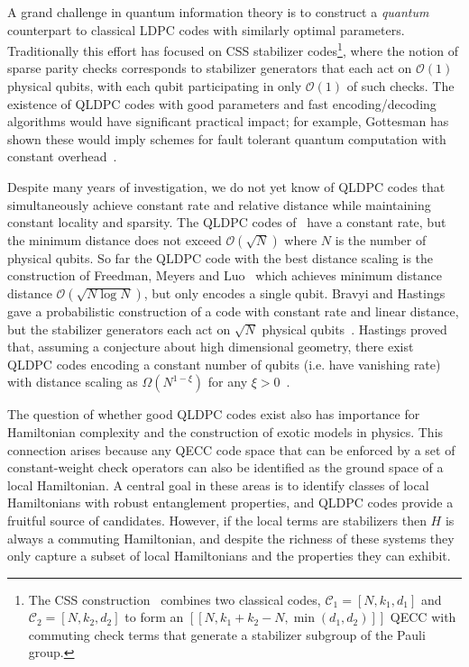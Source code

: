 \documentclass[11pt,letterpaper]{article}
\theoremstyle{definition}
\theoremstyle{remark}
\numberwithin{equation}{section}
\theoremstyle{definition}
\begin{document}
A grand challenge in quantum information theory is to construct a \emph{quantum} counterpart to classical LDPC codes with similarly optimal parameters. Traditionally this effort has focused on CSS stabilizer codes\footnote{The CSS construction~\cite{calderbank1996good,steane1996multiple} combines two classical codes, $\mathcal{C}_1 = [N,k_1,d_1]$ and $\mathcal{C}_2 = [N,k_2,d_2]$ to form an $[[N,k_1 + k_2 - N, \min(d_1,d_2)]]$ QECC with commuting check terms that generate a stabilizer subgroup of the Pauli group.}, where the notion of sparse parity checks corresponds to stabilizer generators that each act on $\mathcal{O}(1)$ physical qubits, with each qubit participating in only $\mathcal{O}(1)$ of such checks. The existence of QLDPC codes with good parameters and fast encoding/decoding algorithms would have significant practical impact; for example, Gottesman has shown these would imply schemes for fault tolerant quantum computation with constant overhead~\cite{gottesman2013fault}. 

Despite many years of investigation, we do not yet know of QLDPC codes that simultaneously achieve constant rate and relative distance while maintaining constant locality and sparsity. The QLDPC codes of~\cite{tillich2014quantum, lloyd2017polylog} have a constant rate, \iffalse, constant locality and sparsity,\fi but the minimum distance does not exceed $\mathcal{O}(\sqrt{N})$ where $N$ is the number of physical qubits. So far the QLDPC code with the best distance scaling is the construction of Freedman, Meyers and Luo~\cite{freedman2002z2} which achieves minimum distance distance $\mathcal{O}(\sqrt{N \log N})$, but only encodes a single qubit.  Bravyi and Hastings gave a probabilistic construction of a code with constant rate and linear distance, but the stabilizer generators each act on $\sqrt{N}$ physical qubits~\cite{bravyi2014homological}. Hastings proved that, assuming a conjecture about high dimensional geometry, there exist QLDPC codes encoding a constant number of qubits (i.e. have vanishing rate) with distance scaling as $\Omega(N^{1 - \xi})$ for any $\xi > 0$~\cite{hastings2017quantum,hastings2017weight}.

%

The question of whether good QLDPC codes exist also has importance for Hamiltonian complexity and the construction of exotic models in physics.  This connection arises because any QECC code space that can be enforced by a set of constant-weight check operators can also be identified as the ground space of a local Hamiltonian.   A central goal in these areas is to identify classes of local Hamiltonians with robust entanglement properties, and QLDPC codes provide a fruitful source of candidates.  However, if the local terms are stabilizers then $H$ is always a commuting Hamiltonian, and despite the richness of these systems they only capture a subset of local Hamiltonians and the properties they can exhibit.%
\end{document}
